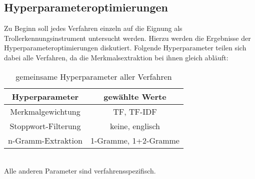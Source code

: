 \subsection{Hyperparameteroptimierungen}
Zu Beginn soll jedes Verfahren einzeln auf die Eignung als Trollerkennungsinstrument untersucht werden. Hierzu werden die Ergebnisse der Hyperparameteroptimierungen diskutiert. Folgende Hyperparameter teilen sich dabei alle Verfahren, da die Merkmalsextraktion bei ihnen gleich abläuft:
\begin{table}[htb]
	\begin{center}
		\begin{tabular}{|c|c|}
			\hline
			Hyperparameter & gewählte Werte \\ \hline \hline
			Merkmalgewichtung & TF, TF-IDF \\ \hline
			Stoppwort-Filterung & keine, englisch\\ \hline
			n-Gramm-Extraktion & 1-Gramme, 1+2-Gramme\\ \hline			
		\end{tabular}
		\caption{gemeinsame Hyperparameter aller Verfahren}\label{common-params}
	\end{center}
\end{table}\\
Alle anderen Parameter sind verfahrensspezifisch.
